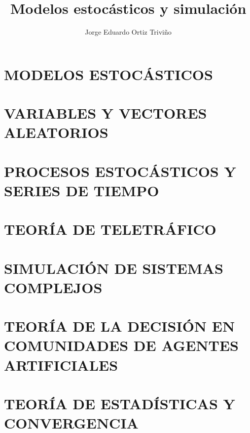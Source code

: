 \documentclass[krantz1,ChapterTOCs]{krantz}
\begin{document}
\frontmatter

\title{Modelos estocásticos y simulación 
}
\author{Jorge Eduardo Ortiz Triviño}

\maketitle

%
\setcounter{page}{1} %
\tableofcontents
%
%
\listoffigures
%
%

\mainmatter
\part{MODELOS ESTOCÁSTICOS}


\part{VARIABLES Y VECTORES ALEATORIOS}


\part{PROCESOS ESTOCÁSTICOS Y SERIES DE TIEMPO}


\part{TEORÍA DE TELETRÁFICO}


\part{SIMULACIÓN DE SISTEMAS COMPLEJOS}


\part{TEORÍA DE LA DECISIÓN EN COMUNIDADES DE AGENTES ARTIFICIALES}


\part{TEORÍA DE ESTADÍSTICAS Y CONVERGENCIA}

\end{document}
